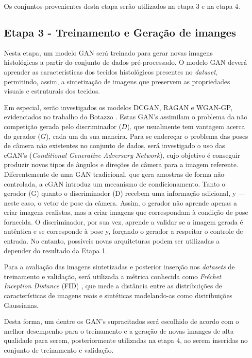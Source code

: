   Os conjuntos provenientes desta etapa serão utilizados na etapa 3 e na etapa 4. 

\subsection{Etapa 3 - Treinamento e Geração de imanges}

Nesta etapa, um modelo GAN será treinado para gerar novas imagens histológicas a partir do conjunto de dados pré-processado. O modelo GAN deverá aprender as características dos tecidos histológicos presentes no \textit{dataset}, permitindo, assim, a sintetização de imagens que preservem as propriedades visuais e estruturais dos tecidos.

Em especial, serão investigados os modelos DCGAN, RAGAN e WGAN-GP, evidenciados no trabalho do Botazzo \cite{rozendo2024histdataaug}. Estas GAN's assimilam o problema da não competição gerada pelo discriminador ($D$), que usualmente tem vantagem acerca do gerador ($G$), cada um da sua maneira. Para se endereçar o problema das poses de câmera não existentes no conjunto de dados, será investigado o uso das cGAN's (\textit{Conditional Generative Adversary Network}), cujo objetivo é conseguir produzir novos tipos de ângulos e direções de câmera para a imagem referente. Diferentemente de uma GAN tradicional, que gera amostras de forma não controlada, a cGAN introduz um mecanismo de condicionamento. Tanto o gerador (G) quanto o discriminador (D) recebem uma informação adicional, y — neste caso, o vetor de pose da câmera. Assim, o gerador não aprende apenas a criar imagens realistas, mas a criar imagens que correspondam à condição de pose fornecida. O discriminador, por sua vez, aprende a validar se a imagem gerada é autêntica e se corresponde à pose y, forçando o gerador a respeitar o controle de entrada. No entanto, possíveis novas arquiteturas podem ser utilizadas a depender do resultado da Etapa 1.

Para a avaliação das imagens sintetizadas e posterior inserção nos \textit{datasets} de treinamento e validação, será utilizada a métrica conhecida como \textit{Fréchet Inception Distance} (FID) \cite{heusel2018ganstrainedtimescaleupdate}, que mede a distância entre as distribuições de características de imagens reais e sintéticas modelando-as como distribuições Gaussianas.

Desta forma, um dentre os GAN's supracitados será escolhido de acordo com o melhor desempenho para o treinamento e a geração de novas imanges de alta qualidade para serem, posteriormente utilizadas na etapa 4, ao serem inseridas no conjunto de treinamento e validação.


